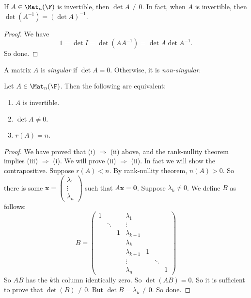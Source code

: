 \documentclass[a4paper]{article}
\begin{document}
\begin{cor}
  If $A \in \Mat_n(\F)$ is invertible, then $\det A \not= 0$. In fact, when $A$ is invertible, then $\det (A^{-1}) = (\det A)^{-1}$.
\end{cor}

\begin{proof}
  We have
  \[
    1 = \det I = \det(AA^{-1}) = \det A\det A^{-1}.
  \]
  So done.
\end{proof}

\begin{defi}
  A matrix $A$ is \emph{singular} if $\det A = 0$. Otherwise, it is \emph{non-singular}.
\end{defi}

\begin{thm}[]
  Let $A \in \Mat_n(\F)$. Then the following are equivalent:
  \begin{enumerate}
    \item $A$ is invertible.
    \item $\det A \not= 0$.
    \item $r(A) = n$.
  \end{enumerate}
\end{thm}

\begin{proof}
  We have proved that (i) $\Rightarrow$ (ii) above, and the rank-nullity theorem implies (iii) $\Rightarrow$ (i). We will prove (ii) $\Rightarrow$ (ii). In fact we will show the contrapositive. Suppose $r(A) < n$. By rank-nullity theorem, $n(A) > 0$. So there is some $\mathbf{x} = \begin{pmatrix}\lambda_1\\\vdots\\\lambda_n\end{pmatrix}$ such that $A\mathbf{x} = \mathbf{0}$. Suppose $\lambda_k \not= 0$. We define $B$ as follows:
  \[
    B =
    \begin{pmatrix}
      1 & & & \lambda_1\\
      & \ddots & & \vdots\\
      & & 1 & \lambda_{k - 1}\\
      & & & \lambda_k\\
      & & & \lambda_{k + 1} & 1\\
      & & & \vdots & & \ddots\\
      & & & \lambda_n & & & 1
    \end{pmatrix}
  \]
  So $AB$ has the $k$th column identically zero. So $\det(AB) = 0$. So it is sufficient to prove that $\det (B) \not= 0$. But $\det B = \lambda_k \not= 0$. So done.
\end{proof}
\end{document}
